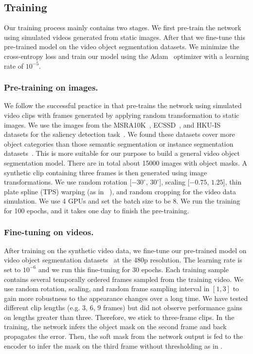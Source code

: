 \documentclass[runningheads]{llncs}
\begin{document}
\subsection{Training}
\label{sec:train}

Our training process mainly contains two stages. We first pre-train the network using simulated videos generated from static images. After that we fine-tune this pre-trained model on the video object segmentation datasets. We minimize the cross-entropy loss and train our model using the Adam~\cite{adam} optimizer with a learning rate of $10^{-5}$.

\subsubsection{Pre-training on images.}
We follow the successful practice in \cite{stm,ranet,rgmp} that pre-trains the network using simulated video clips with frames generated by applying random transformation to static images. We use the images from the MSRA10K~\cite{msra10k}, ECSSD~\cite{ecssd}, and HKU-IS~\cite{hkuis} datasets for the saliency detection task~\cite{borji2015salient}. We found these datasets cover more object categories than those semantic segmentation or instance segmentation datasets~\cite{pascal-voc,sbd,coco}. This is more suitable for our purpose to build a general video object segmentation model. There are in total about 15000 images with object masks. A synthetic clip containing three frames is then generated using image transformations. We use random rotation [$-30^\circ$, $30^\circ$], scaling [$-0.75$, $1.25$], thin plate spline (TPS) warping (as in ~\cite{masktrack}), and random cropping for the video data simulation. We use 4 GPUs and set the batch size to be 8. We run the training for 100 epochs, and it takes one day to finish the pre-training.

\subsubsection{Fine-tuning on videos.}
After training on the synthetic video data, we fine-tune our pre-trained model on video object segmentation datasets~\cite{davis2016,davis2017} at the 480p resolution. The learning rate is set to $10^{-6}$ and we run this fine-tuning for 30 epochs. Each training sample contains several temporally ordered frames sampled from the training video. We use random rotation, scaling, and random frame sampling interval in $[1, 3]$ to gain more robustness to the appearance changes over a long time. We have tested different clip lengths (e.g. 3, 6, 9 frames) but did not observe performance gains on lengths greater than three. Therefore, we stick to three-frame clips. In the training, the network infers the object mask on the second frame and back propagates the error. Then, the soft mask from the network output is fed to the encoder to infer the mask on the third frame without thresholding as in \cite{stm}.
\end{document}
